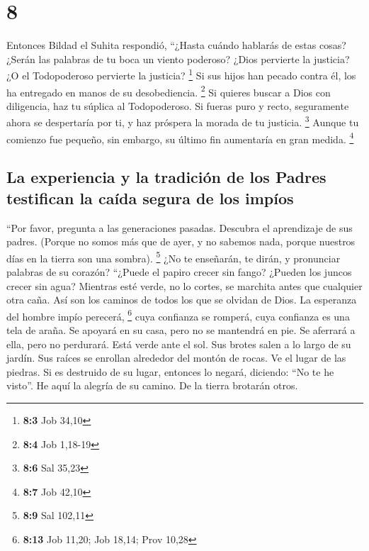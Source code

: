 \hypertarget{section-7}{%
\section{8}\label{section-7}}

 Entonces Bildad el Suhita respondió, 
``¿Hasta cuándo hablarás de estas cosas? ¿Serán las palabras de tu boca
un viento poderoso?  ¿Dios pervierte la justicia? ¿O el
Todopoderoso pervierte la justicia? \footnote{\textbf{8:3} Job 34,10}
 Si sus hijos han pecado contra él, los ha entregado en
manos de su desobediencia. \footnote{\textbf{8:4} Job 1,18-19}
 Si quieres buscar a Dios con diligencia, haz tu súplica
al Todopoderoso.  Si fueras puro y recto, seguramente
ahora se despertaría por ti, y haz próspera la morada de tu justicia.
\footnote{\textbf{8:6} Sal 35,23}  Aunque tu comienzo fue
pequeño, sin embargo, su último fin aumentaría en gran medida.
\footnote{\textbf{8:7} Job 42,10}

\hypertarget{la-experiencia-y-la-tradiciuxf3n-de-los-padres-testifican-la-cauxedda-segura-de-los-impuxedos}{%
\subsection{La experiencia y la tradición de los Padres testifican la
caída segura de los
impíos}\label{la-experiencia-y-la-tradiciuxf3n-de-los-padres-testifican-la-cauxedda-segura-de-los-impuxedos}}

 ``Por favor, pregunta a las generaciones pasadas.
Descubra el aprendizaje de sus padres.  (Porque no somos
más que de ayer, y no sabemos nada, porque nuestros días en la tierra
son una sombra). \footnote{\textbf{8:9} Sal 102,11}  ¿No
te enseñarán, te dirán, y pronunciar palabras de su corazón?
 ``¿Puede el papiro crecer sin fango? ¿Pueden los juncos
crecer sin agua?  Mientras esté verde, no lo cortes, se
marchita antes que cualquier otra caña.  Así son los
caminos de todos los que se olvidan de Dios. La esperanza del hombre
impío perecerá, \footnote{\textbf{8:13} Job 11,20; Job 18,14; Prov 10,28}
 cuya confianza se romperá, cuya confianza es una tela de
araña.  Se apoyará en su casa, pero no se mantendrá en
pie. Se aferrará a ella, pero no perdurará.  Está verde
ante el sol. Sus brotes salen a lo largo de su jardín. 
Sus raíces se enrollan alrededor del montón de rocas. Ve el lugar de las
piedras.  Si es destruido de su lugar, entonces lo
negará, diciendo: ``No te he visto''.  He aquí la alegría
de su camino. De la tierra brotarán otros.

